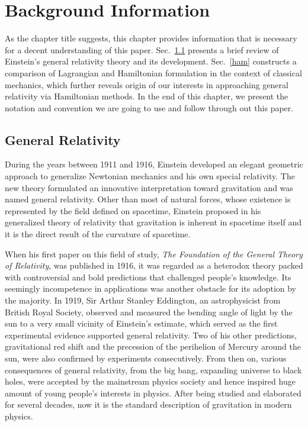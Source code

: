 \chapter{Background Information} \label{background} As the chapter title suggests, this chapter provides information that is necessary for a decent understanding of this paper. Sec.~\ref{gr} presents a brief review of Einstein's general relativity theory and its development. Sec.~\ref{ham} constructs a comparison of Lagrangian and Hamiltonian formulation in the context of classical mechanics, which further reveals origin of our interests in approaching general relativity via Hamiltonian methods. In the end of this chapter, we present the notation and convention we are going to use and follow through out this paper. 
\section{General Relativity}\label{gr}
During the years between 1911 and 1916, Einstein developed an elegant geometric approach to generalize Newtonian mechanics and his own special relativity. The new theory formulated an innovative interpretation toward gravitation and was named general relativity. Other than most of natural forces, whose existence is represented by the field defined on spacetime, Einstein proposed in his generalized theory of relativity that gravitation is inherent in spacetime itself and it is the direct result of the curvature of spacetime\cite{carroll2003spacetime}.

When his first paper on this field of study, {\it The Foundation of the General Theory of Relativity}, was published in 1916, it was regarded as a heterodox theory packed with controversial and bold predictions that challenged people's knowledge. Its seemingly incompetence in applications was another obstacle for its adoption by the majority. In 1919, Sir Arthur Stanley Eddington, an astrophysicist from British Royal Society, observed and measured the bending angle of light by the sun to a very small vicinity of Einstein's estimate, which served as the first experimental evidence supported general relativity. Two of his other predictions, gravitational red shift and the precession of the perihelion of Mercury around the sun, were also confirmed by experiments consecutively. From then on, various consequences of general relativity, from the big bang, expanding universe to black holes, were accepted by the mainstream physics society and hence inspired huge amount of young people's interests in physics. After being studied and elaborated for several decades, now it is the standard description of gravitation in modern physics. 

